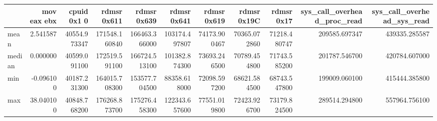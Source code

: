 \begin{tabular}{lrrrrrrrrrr}
\toprule
 & mov eax ebx & cpuid 0x1 0 & rdmsr 0x611 & rdmsr 0x639 & rdmsr 0x641 & rdmsr 0x619 & rdmsr 0x19C & rdmsr 0x17 & sys_call_overhead_proc_read & sys_call_overhead_sys_read \\
\midrule
mean & 2.541587 & 40554.973347 & 171548.160840 & 166463.366000 & 103174.497807 & 74173.900467 & 70365.072860 & 71218.480747 & 209585.697347 & 439335.285587 \\
median & 0.000000 & 40599.091100 & 172519.591100 & 166724.513100 & 101382.874300 & 73693.246500 & 70789.454800 & 71743.585200 & 201787.546700 & 420784.607000 \\
min & -0.096100 & 40187.231300 & 164015.708300 & 153577.704500 & 88358.618000 & 72098.597200 & 68621.584500 & 68743.547800 & 199009.060100 & 415444.385800 \\
max & 38.040100 & 40848.768200 & 176268.873700 & 175276.458300 & 122343.657600 & 77551.019800 & 72423.926700 & 73179.824500 & 289514.294800 & 557964.756100 \\
\bottomrule
\end{tabular}
